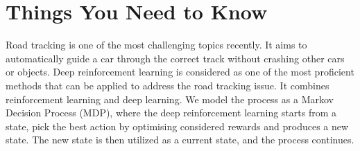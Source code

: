 
\chapter{Things You Need to Know}
\begin{intro}
	Road tracking is one of the most challenging topics recently. It aims to automatically guide a car through the correct track without crashing other cars or objects. Deep reinforcement learning is considered as one of the most proficient methods that can be applied to address the road tracking issue. It combines reinforcement learning and deep learning. We model the process as a Markov Decision Process (MDP), where the deep reinforcement learning starts from a state, pick the best action by optimising considered rewards and produces a new state. The new state is then utilized as a current state, and the process continues.  


\end{intro}
